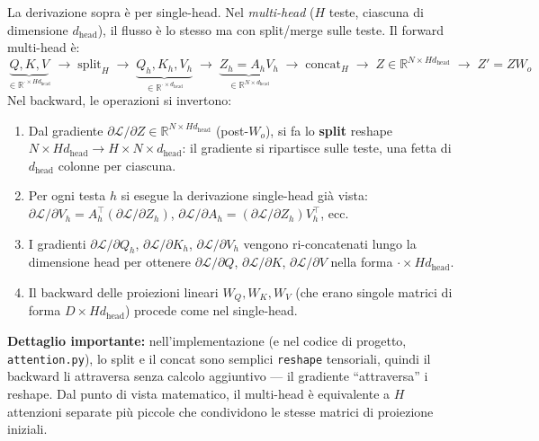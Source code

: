 \documentclass[
  11pt,
]{article}
\begin{document}
\begin{notabox}[title={\textbf{Multi-head backward: come cambia il flusso}}]
La derivazione sopra è per single-head. Nel \emph{multi-head} ($H$ teste, ciascuna di dimensione $d_{\text{head}}$), il flusso è lo stesso ma con split/merge sulle teste. Il forward multi-head è:
\[
\underbrace{Q, K, V}_{\in \mathbb{R}^{\cdot \times H d_{\text{head}}}} \;\to\; \text{split}_H \;\to\; \underbrace{Q_h, K_h, V_h}_{\in \mathbb{R}^{\cdot \times d_{\text{head}}}} \;\to\; \underbrace{Z_h = A_h V_h}_{\in \mathbb{R}^{N \times d_{\text{head}}}} \;\to\; \text{concat}_H \;\to\; Z \in \mathbb{R}^{N \times H d_{\text{head}}} \;\to\; Z' = Z W_o
\]
Nel backward, le operazioni si invertono:

\begin{enumerate}\setlength\itemsep{0.3em}
\item Dal gradiente $\partial\mathcal{L}/\partial Z \in \mathbb{R}^{N \times H d_{\text{head}}}$ (post-$W_o$), si fa lo \textbf{split} reshape $N \times H d_{\text{head}} \to H \times N \times d_{\text{head}}$: il gradiente si ripartisce sulle teste, una fetta di $d_{\text{head}}$ colonne per ciascuna.
\item Per ogni testa $h$ si esegue la derivazione single-head già vista: $\partial\mathcal{L}/\partial V_h = A_h^\top (\partial\mathcal{L}/\partial Z_h)$, $\partial\mathcal{L}/\partial A_h = (\partial\mathcal{L}/\partial Z_h) V_h^\top$, ecc.
\item I gradienti $\partial\mathcal{L}/\partial Q_h$, $\partial\mathcal{L}/\partial K_h$, $\partial\mathcal{L}/\partial V_h$ vengono ri-concatenati lungo la dimensione head per ottenere $\partial\mathcal{L}/\partial Q$, $\partial\mathcal{L}/\partial K$, $\partial\mathcal{L}/\partial V$ nella forma $\cdot \times H d_{\text{head}}$.
\item Il backward delle proiezioni lineari $W_Q, W_K, W_V$ (che erano singole matrici di forma $D \times H d_{\text{head}}$) procede come nel single-head.
\end{enumerate}

\textbf{Dettaglio importante:} nell'implementazione (e nel codice di progetto, \texttt{attention.py}), lo split e il concat sono semplici \texttt{reshape} tensoriali, quindi il backward li attraversa senza calcolo aggiuntivo --- il gradiente ``attraversa'' i reshape. Dal punto di vista matematico, il multi-head è equivalente a $H$ attenzioni separate più piccole che condividono le stesse matrici di proiezione iniziali.
\end{notabox}
\end{document}
